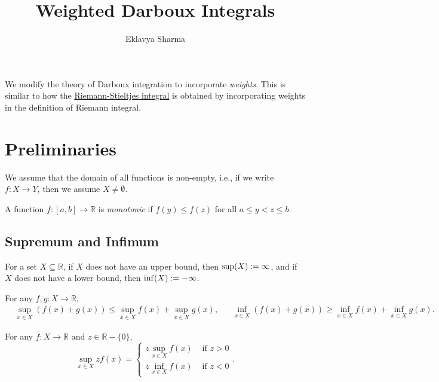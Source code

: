 \documentclass[a4paper,12pt,fleqn]{article}
\author{Eklavya Sharma}
\date{\empty}
\title{Weighted Darboux Integrals}
\begin{document}
\maketitle
\setlength{\parskip}{0.2em}

We modify the theory of Darboux integration to incorporate \emph{weights}.
This is similar to how the
\href{https://en.wikipedia.org/wiki/Riemann\%E2\%80\%93Stieltjes_integral}{Riemann-Stieltjes integral}
is obtained by incorporating weights in the definition of Riemann integral.

\section{Preliminaries}

We assume that the domain of all functions is non-empty,
i.e., if we write $f: X \to Y$, then we assume $X \neq \emptyset$.

\begin{definition}
A function $f: [a, b] \to \mathbb{R}$ is \emph{monotonic} if
$f(y) \le f(z)$ for all $a \le y < z \le b$.
\end{definition}

\subsection{Supremum and Infimum}

For a set $X \subseteq \mathbb{R}$,
if $X$ does not have an upper bound, then $\sup(X) := \infty$,
and if $X$ does not have a lower bound, then $\inf(X) := -\infty$.

\begin{lemma}
\label{thm:sum-of-sup-inf}
For any $f, g: X \to \mathbb{R}$,
\begin{align*}
& \sup_{x \in X} (f(x) + g(x)) \le \sup_{x \in X} f(x) + \sup_{x \in X} g(x),
&& \inf_{x \in X} (f(x) + g(x)) \ge \inf_{x \in X} f(x) + \inf_{x \in X} g(x).
\end{align*}
\end{lemma}

\begin{lemma}
\label{thm:scaling-sup-inf}
For any $f: X \to \mathbb{R}$ and $z \in \mathbb{R} - \{0\}$,
\[ \sup_{x \in X} zf(x) = \begin{cases}
z\sup_{x \in X} f(x) & \text{ if } z > 0
\\ z\inf_{x \in X} f(x) & \text{ if } z < 0
\end{cases}. \]
\end{lemma}
\end{document}
